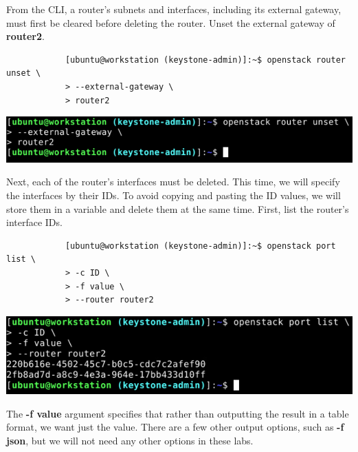 \documentclass[letterpaper, 12pt]{article}
\begin{document}
\begin{enumerate}
    \begin{labstep}
        From the CLI, a router's subnets and interfaces, including its external gateway, must first be cleared before deleting the router.
        Unset the external gateway of \textbf{router2}.
        \begin{lstlisting}
            [ubuntu@workstation (keystone-admin)]:~$ openstack router unset \
            > --external-gateway \
            > router2
        \end{lstlisting}

        \begin{center}
            \includegraphics[width=\linewidth]{images/part4/step3.png}
        \end{center}
    \end{labstep}

    \begin{labstep}
        Next, each of the router's interfaces must be deleted.
        This time, we will specify the interfaces by their IDs.
        To avoid copying and pasting the ID values, we will store them in a variable and delete them at the same time.
        First, list the router's interface IDs.
        \begin{lstlisting}
            [ubuntu@workstation (keystone-admin)]:~$ openstack port list \
            > -c ID \
            > -f value \
            > --router router2
        \end{lstlisting}

        \begin{center}
            \includegraphics[width=\linewidth]{images/part4/step4.png}
        \end{center}
    \end{labstep}

    \begin{notebox}
        The \textbf{-f value} argument specifies that rather than outputting the result in a table format, we want just the value.
        There are a few other output options, such as \textbf{-f json}, but we will not need any other options in these labs.
    \end{notebox}


\end{enumerate}
\end{document}

